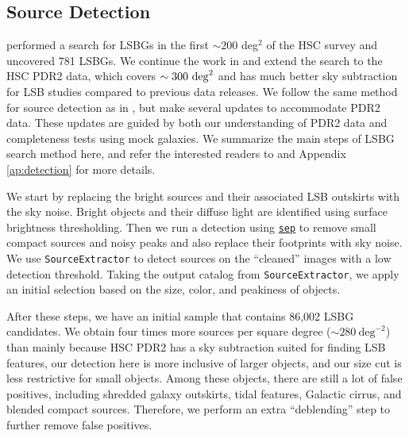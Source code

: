 \documentclass[twocolumn,astrosymb,twocolappendix]{aastex631}
\newcommand{\code}[1]{\texttt{#1}}
\begin{document}
\begin{CJK*}{UTF8}{gbsn}
\subsection{Source Detection}\label{sec:detection}
 performed a search for LSBGs in the first $\sim 200$ deg$^2$ of the HSC survey and uncovered 781 LSBGs. We continue the work in  and extend the search to the HSC PDR2 data, which covers $\sim 300\ \rm{deg}^{2}$ and has much better sky subtraction for LSB studies compared to previous data releases. We follow the same method for source detection as in , but make several updates to accommodate PDR2 data. These updates are guided by both our understanding of PDR2 data and completeness tests using mock galaxies. We summarize the main steps of LSBG search method here, and refer the interested readers to  and Appendix \ref{ap:detection} for more details. 

We start by replacing the bright sources and their associated LSB outskirts with the sky noise. Bright objects and their diffuse light are identified using surface brightness thresholding. Then we run a detection using \href{https://sep.readthedocs.io/en/v1.1.x}{\code{sep}} \citep{Barbary2016} to remove small compact sources and noisy peaks and also replace their footprints with sky noise. We use \code{SourceExtractor} to detect sources on the ``cleaned'' images with a low detection threshold. Taking the output catalog from \code{SourceExtractor}, we apply an initial selection based on the size, color, and peakiness of objects. 

After these steps, we have an initial sample that contains 86,002 LSBG candidates. We obtain four times more sources per square degree ($\sim 280\ \mathrm{deg}^{-2}$) than  mainly because HSC PDR2 has a sky subtraction suited for finding LSB features, our detection here is more inclusive of larger objects, and our size cut is less restrictive for small objects. Among these objects, there are still a lot of false positives, including shredded galaxy outskirts, tidal features, Galactic cirrus, and blended compact sources. Therefore, we perform an extra ``deblending'' step to further remove false positives.  



\end{CJK*}
\end{document}
